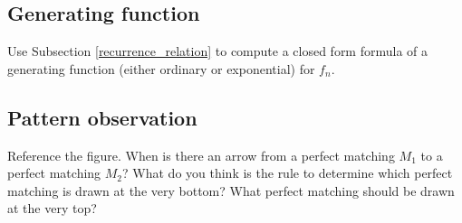 \documentclass[10pt, oneside]{amsart}
\begin{document}
\subsection{Generating function} 
Use Subsection \ref{recurrence_relation} to compute a closed form formula of a generating function (either ordinary or exponential) for $f_n$.


\subsection{Pattern observation}
Reference the figure. 
When is there an arrow from a perfect matching $M_1$ to a perfect matching $M_2$? What do you think is the rule to determine which perfect matching is drawn at the very bottom?  What perfect matching should be drawn at the very top?
\end{document}
